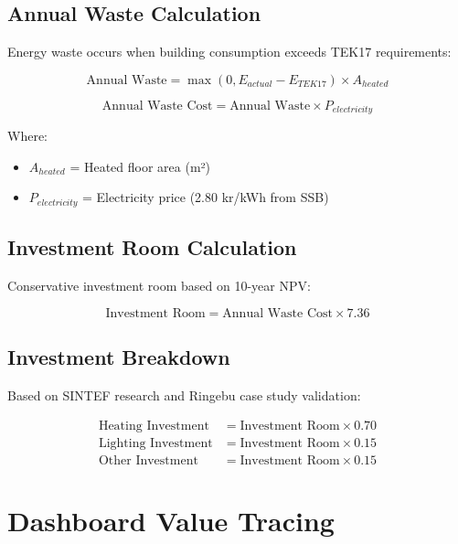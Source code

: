 \documentclass[12pt,a4paper]{article}
\begin{document}
\subsection{Annual Waste Calculation}

Energy waste occurs when building consumption exceeds TEK17 requirements:

\begin{equation}
\text{Annual Waste} = \max(0, E_{actual} - E_{TEK17}) \times A_{heated}
\end{equation}

\begin{equation}
\text{Annual Waste Cost} = \text{Annual Waste} \times P_{electricity}
\end{equation}

Where:
\begin{itemize}
\item $A_{heated}$ = Heated floor area (m²)
\item $P_{electricity}$ = Electricity price (2.80 kr/kWh from SSB)
\end{itemize}

\subsection{Investment Room Calculation}

Conservative investment room based on 10-year NPV:

\begin{equation}
\text{Investment Room} = \text{Annual Waste Cost} \times 7.36
\end{equation}

\subsection{Investment Breakdown}

Based on SINTEF research and Ringebu case study validation:

\begin{align}
\text{Heating Investment} &= \text{Investment Room} \times 0.70 \\
\text{Lighting Investment} &= \text{Investment Room} \times 0.15 \\
\text{Other Investment} &= \text{Investment Room} \times 0.15
\end{align}

\section{Dashboard Value Tracing}
\end{document}
